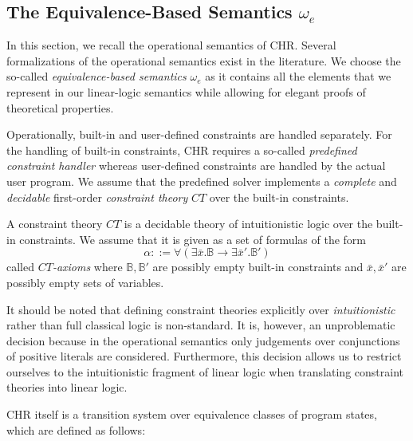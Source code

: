 \documentclass[acmtocl]{acmtrans2m}
\newcommand{\B}{\ensuremath{\mathbb{B}}}
\newcommand{\bx}{\bar{x}}
\newcommand{\oesq}{\ensuremath{\omega_{e}}}
\begin{document}
\subsection{The Equivalence-Based Semantics $\oesq$}
\label{sec:op-sem}

In this section, we recall the operational semantics of CHR. Several
formalizations of the operational semantics  exist in the literature. We
choose the so-called \emph{equivalence-based semantics} $\oesq$ as it contains
all the elements that we represent in our linear-logic semantics while allowing
for elegant proofs of theoretical properties.

Operationally, built-in and user-defined constraints are handled separately. For
the handling of built-in constraints, CHR requires a so-called
\emph{predefined constraint handler} whereas user-defined constraints are
handled by the actual user program. We assume that the predefined solver
implements a \emph{complete} and \emph{decidable} first-order \emph{constraint theory}
$CT$ over the built-in constraints.

\begin{definition} A constraint theory $CT$ is a decidable
theory of intuitionistic logic over the built-in constraints. We assume that it
is given as a set of formulas  of the form \[
\alpha::=\forall(\exists\bx.\B\rightarrow\exists\bx'.\B') \] called
\emph{$CT$-axioms} where $\B,\B'$ are possibly empty built-in constraints and
$\bx,\bx'$ are possibly empty sets of variables.
\end{definition}

It should be noted that defining constraint theories explicitly over
\emph{intuitionistic} rather than full classical logic is non-standard. It is,
however, an unproblematic decision because in the operational semantics only
judgements over conjunctions of positive literals are considered. Furthermore,
this decision allows us to restrict ourselves to the intuitionistic fragment of
linear logic when translating constraint theories into linear logic.

CHR itself is a transition system over equivalence classes of program states,
which are defined as follows:
\end{document}
